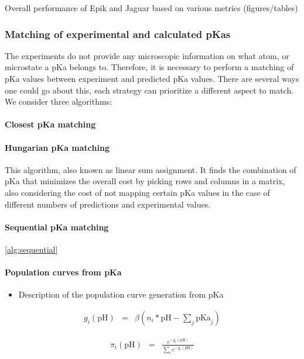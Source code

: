 \documentclass[9pt,lineno]{elife}
\newcommand{\pH}{\mathrm{pH}}
\newcommand{\pKa}{\mathrm{pKa}}
\begin{document}
Overall performance of Epik and Jaguar based on various metrics (figures/tables)
\subsubsection {Matching of experimental and calculated pKas}


The experiments do not provide any microscopic information on what atom, or microstate a pKa belongs to.
%
Therefore, it is necessary to perform a matching of pKa values between experiment and predicted pKa values.
%
There are several ways one could go about this, each strategy can prioritize a different aspect to match.
%
We consider three algorithms:
\paragraph{Closest pKa matching}
%



%
\paragraph{Hungarian pKa matching}
This algorithm, also known as linear sum assignment.
%
It finds the combination of pKa that minimizes the overall cost by picking rows and columns in a matrix, also considering the cost of not mapping certain pKa values in the case of different numbers of predictions and experimental values.
%
\paragraph{Sequential pKa matching}

\cref{alg:sequential}

\paragraph{Population curves from pKa}

\begin{itemize}
    \item Description of the population curve generation from pKa \\
\end{itemize}

\begin{eqnarray}
  g_i(\pH) &=& \beta \left( n_i*\pH - \sum_j \pKa_j \right)
\end{eqnarray}

\begin{eqnarray}
 \pi_i(\pH) &=& \frac{e^{-g_i(\pH)}}{\sum_i e^{-g_i(\pH)} }
\end{eqnarray}
\end{document}
